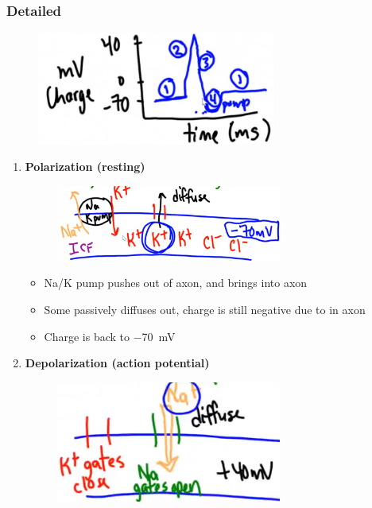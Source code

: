 \documentclass[a4paper,12pt]{article}
\begin{document}
\subsubsection{Detailed}
\begin{figure}[H]
    \centering
    \includegraphics[width=0.7\textwidth]{ngraph}
\end{figure}
\begin{enumerate}
    \item{
            \textbf{Polarization (resting)}
            \begin{figure}[H]
                \centering
                \includegraphics[width=0.7\textwidth]{n1}
            \end{figure}
            \begin{itemize}
                \item{Na/K pump pushes  out of axon, and brings  into axon}
                \item{Some  passively diffuses out, charge is still negative due to  in axon}
                \item{Charge is back to \SI{-70}{\mV}}
            \end{itemize}
        }
    \item{
            \textbf{Depolarization (action potential)}
            \begin{figure}[H]
                \centering
                \includegraphics[width=0.7\textwidth]{n2}

\end{figure}}
\end{enumerate}
\end{document}

